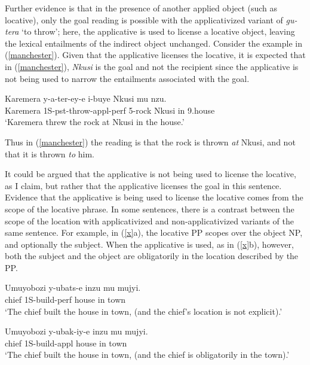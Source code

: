 \documentclass[output=paper]{langsci/langscibook}
\begin{document}
Further evidence is that in the presence of another applied object (such as {\sc locative}), only the {\sc goal} reading is possible with the applicativized variant of \emph{gu-tera} `to throw'; here, the applicative is used to license a {\sc locative} object, leaving the lexical entailments of the indirect object unchanged. Consider the example in (\ref{manchester}). Given that the applicative licenses the {\sc locative}, it is expected that in (\ref{manchester}), \emph{Nkusi} is the {\sc goal} and not the {\sc recipient} since the applicative is not being used to narrow the entailments associated with the {\sc goal}. 

\begin{exe}
\ex\label{manchester}\gll Karemera y-a-ter-ey-e i-buye Nkusi mu nzu.\\
		Karemera {\sc 1S-pst-}throw-{\sc appl-perf} 5-rock Nkusi in 9.house\\
		\glt `Karemera threw the rock at Nkusi in the house.'\\
	\end{exe}
	Thus in (\ref{manchester}) the reading is that the rock is thrown \emph{at} Nkusi, and not that it is thrown \emph{to} him.
		
	\iffalse  It could be argued that the applicative is not being used to license the locative, as I claim, but rather that the applicative licenses the goal in this sentence.  Evidence that the applicative is being used to license the locative comes from the scope of the locative phrase. In some sentences, there is a contrast between the scope of the location with applicativized and  non-applicativized variants of the same sentence. For example, in (\ref{x}a), the locative PP scopes over the object NP, and optionally the subject. When the applicative is used, as in (\ref{x}b), however, both the subject and the object are obligatorily in the location described by the PP.

\begin{exe}
\ex\label{x}\begin{xlist}
\ex\gll Umuyobozi y-ubats-e inzu mu mujyi.\\
		chief {\sc 1S-}build-{\sc perf} house in town\\
		\glt `The chief built the house in town, (and the chief's location is not explicit).'

\ex\gll Umuyobozi y-ubak-iy-e inzu mu mujyi.\\
		chief		{\sc 1S}-build-{\sc appl} house in town\\
		\glt `The chief built the house in town, (and the chief is obligatorily in the town).'
\end{xlist}
\end{exe}
\end{document}
